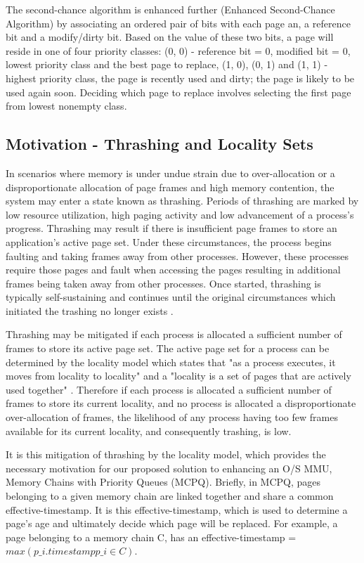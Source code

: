\documentclass[10pt,a4paper,twocolumn]{article}
\begin{document}
The second-chance algorithm is enhanced further (Enhanced Second-Chance Algorithm) by associating an
ordered pair of bits with each page an, a reference bit and a modify/dirty bit. Based on the value
of these two bits, a page will reside in one of four priority classes: (0, 0) - reference bit = 0,
modified bit = 0, lowest priority class and the best page to replace, (1, 0), (0, 1) and (1, 1) -
highest priority class, the page is recently used and dirty; the page is likely to be used again
soon. Deciding which page to replace involves selecting the first page from lowest nonempty class.

\subsection{Motivation - Thrashing and Locality Sets}
In scenarios where memory is under undue
strain due to over-allocation or a disproportionate allocation of page frames and high memory
contention, the system may enter a state known as thrashing. Periods of thrashing are marked by low
resource utilization, high paging activity and low advancement of a process's progress.  Thrashing
may result if there is insufficient page frames to store an application's active page set. Under
these circumstances, the process begins faulting and taking frames away from other processes.
However, these processes require those pages and fault when accessing the pages resulting in
additional frames being taken away from other processes.  Once started, thrashing is typically
self-sustaining and continues until the original circumstances which initiated the trashing no
longer exists \cite{THRAS}. 

Thrashing may be mitigated if each process is allocated a sufficient number of frames to store its
active page set. The active page set for a process can be determined by the locality model which
states that "as a process executes, it moves from locality to locality" and a "locality is a set of
pages that are actively used together" \cite{SILBER}. Therefore if each process
is allocated a sufficient number of frames to store its current locality, and no process is
allocated a disproportionate over-allocation of frames, the likelihood of any process having too few
frames available for its current locality, and consequently trashing, is low.

It is this mitigation of thrashing by the locality model, which provides the necessary motivation
for our proposed solution to enhancing an O/S MMU, Memory Chains with Priority Queues (MCPQ).
	Briefly, in MCPQ, pages belonging to a given memory chain are linked together and share a common
	effective-timestamp. It is this effective-timestamp, which is used to determine a page's age and
	ultimately decide which page will be replaced. For example, a page belonging to a memory chain
	C, has an effective-timestamp = $max(p\_{i}.timestamp p\_{i} \in C)$.
\end{document}
